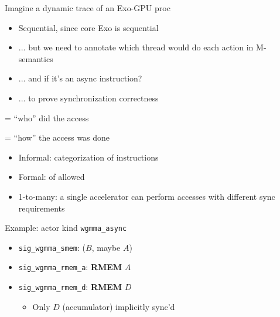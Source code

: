 \newpage
\begin{minipage}[t]{0.48\textwidth}\fixminipage
\vspace{-5mm}

\vspace{4mm}
Imagine a dynamic trace of an Exo-GPU proc
\begin{itemize}
  \item Sequential, since core Exo is sequential
  \item ... but we need to annotate which thread would do each action in M-semantics
  \item ... and if it's an async instruction?
  \item ... to prove synchronization correctness
\end{itemize}
 = ``who'' did the access

 = ``how'' the access was done

\begin{itemize}
  \item Informal: categorization of instructions
  \item Formal:  of allowed 
  \item 1-to-many: a single accelerator can perform accesses with different sync requirements
\end{itemize}

Example: actor kind \texttt{wgmma\_async}
\begin{itemize}
  \item \texttt{sig\_wgmma\_smem}:  ($B$, maybe $A$)
  \item \texttt{sig\_wgmma\_rmem\_a}: \textbf{RMEM} $A$
  \item \texttt{sig\_wgmma\_rmem\_d}: \textbf{RMEM} $D$
  \begin{itemize}
    \item Only $D$ (accumulator) implicitly sync'd
  \end{itemize}
\end{itemize}

\end{minipage}
\hfill
